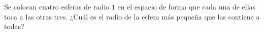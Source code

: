 Se colocan cuatro esferas de radio $1$ en el espacio de forma que cada una de ellas toca a las otras tres. ¿Cuál es el radio de la esfera más pequeña que las contiene a todas? 
